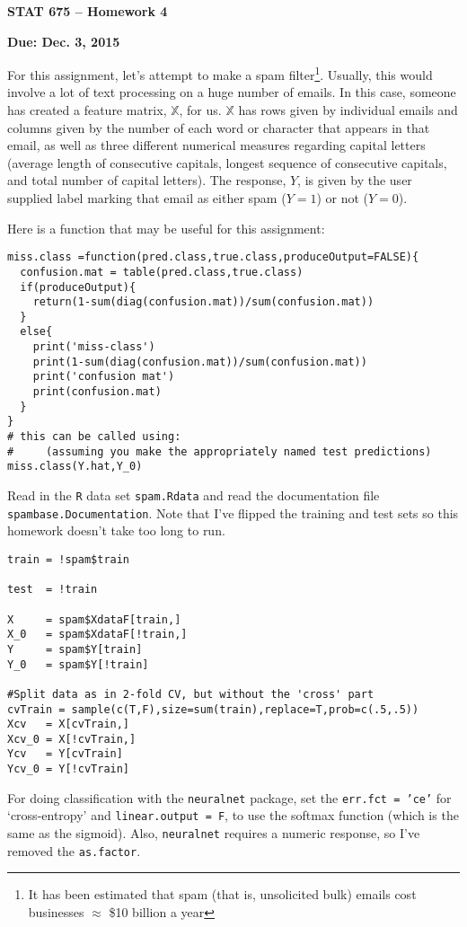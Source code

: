 \documentclass[11pt]{article}
\begin{document}
\baselineskip=13.2pt
\parindent=0pt
\parskip=13.2pt
\pagestyle{empty}

\centerline{\bf \Large STAT 675 -- Homework 4}
\centerline{\bf \large Due: Dec. 3, 2015} 

For this assignment, let's attempt to make a spam filter\footnote{It has been estimated that spam (that is, unsolicited bulk) emails cost businesses
$\approx$ \$10 billion a year}.  Usually, this would involve a lot of text processing on a huge number of emails.  
In this case, someone has created a 
feature matrix, $\mathbb{X}$, for us.  $\mathbb{X}$ has rows given by individual emails and columns given by the number of each word or character that appears 
in that email, as well as three different numerical measures regarding capital letters (average
length of consecutive capitals, longest sequence of consecutive capitals, and total number of capital letters).   
The response, $Y$, is given by the user supplied label marking that email as either spam ($Y = 1$) or not ($Y = 0$).

Here is a function that may be useful for this assignment:
\begin{verbatim}
miss.class =function(pred.class,true.class,produceOutput=FALSE){
  confusion.mat = table(pred.class,true.class)
  if(produceOutput){
    return(1-sum(diag(confusion.mat))/sum(confusion.mat))	
  }
  else{
    print('miss-class')
    print(1-sum(diag(confusion.mat))/sum(confusion.mat))
    print('confusion mat')
    print(confusion.mat)
  }
}
# this can be called using: 
#     (assuming you make the appropriately named test predictions)
miss.class(Y.hat,Y_0)
\end{verbatim}

Read in the {\tt R} data set {\tt spam.Rdata} and read the documentation file {\tt spambase.Documentation}. 
Note that I've flipped the training and test sets so this homework doesn't take too long to run.
\begin{verbatim}
train = !spam$train

test  = !train

X     = spam$XdataF[train,]
X_0   = spam$XdataF[!train,]
Y     = spam$Y[train]
Y_0   = spam$Y[!train]

#Split data as in 2-fold CV, but without the 'cross' part
cvTrain = sample(c(T,F),size=sum(train),replace=T,prob=c(.5,.5))
Xcv   = X[cvTrain,]
Xcv_0 = X[!cvTrain,]
Ycv   = Y[cvTrain]
Ycv_0 = Y[!cvTrain]
\end{verbatim}

For doing classification with the {\tt neuralnet} package, set the {\tt err.fct = 'ce'} for `cross-entropy' 
and {\tt linear.output = F}, to use the softmax function (which is the same as the sigmoid).  Also,
{\tt neuralnet} requires a numeric response, so I've removed the {\tt as.factor}.
\end{document}
